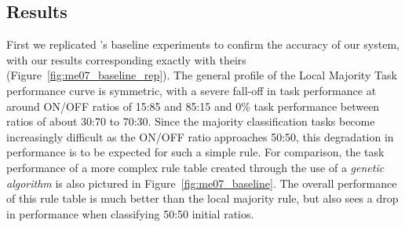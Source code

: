 \documentclass[a4paper,11pt,twoside]{report}
\begin{document}
\subsection*{Results}
First we replicated \citeauthor{me07}'s baseline experiments to confirm the accuracy of our system, with our results corresponding exactly with theirs (Figure~\ref{fig:me07_baseline_rep}). The general profile of the Local Majority Task performance curve is symmetric, with a severe fall-off in task performance at around ON/OFF ratios of 15:85 and 85:15 and 0\% task performance between ratios of about 30:70 to 70:30. Since the majority classification tasks become increasingly difficult as the ON/OFF ratio approaches 50:50, this degradation in performance is to be expected for such a simple rule. For comparison, the task performance of a more complex rule table created through the use of a \textit{genetic algorithm} is also pictured in Figure~\ref{fig:me07_baseline}. The overall performance of this rule table is much better than the local majority rule, but also sees a drop in performance when classifying 50:50 initial ratios.
\end{document}
